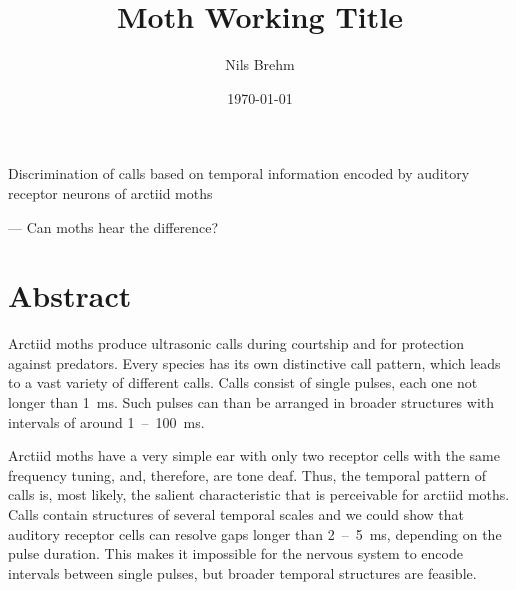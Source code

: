\documentclass[12pt,a4paper,pdftex]{article}
\title{Moth Working Title}
\author{Nils Brehm} %
\date{\today} %
\begin{document}
\begin{titlepage}
	\begin{center}
		\vspace*{1cm}
		
		\begin{huge}
Discrimination of calls based on temporal information encoded by auditory receptor neurons of arctiid moths\\
		\end{huge}
		\begin{Large}
			\vspace{1cm}
			--- Can moths hear the difference?\\
		\end{Large}
	\end{center}
\end{titlepage}

\newpage

\section*{Abstract}
Arctiid moths produce ultrasonic calls during courtship and for protection against predators. Every species has its own distinctive call pattern, which leads to a vast variety of different calls. Calls consist of single pulses, each one not longer than 1~ms. Such pulses can than be arranged in broader structures with intervals of around 1~--~100~ms.

Arctiid moths have a very simple ear with only two receptor cells with the same frequency tuning, and, therefore, are tone deaf. Thus, the temporal pattern of calls is, most likely, the salient characteristic that is perceivable for arctiid moths. Calls contain structures of several temporal scales and we could show that auditory receptor cells can resolve gaps longer than 2~--~5~ms, depending on the pulse duration. This makes it impossible for the nervous system to encode intervals between single pulses, but broader temporal structures are feasible. 
\end{document}
